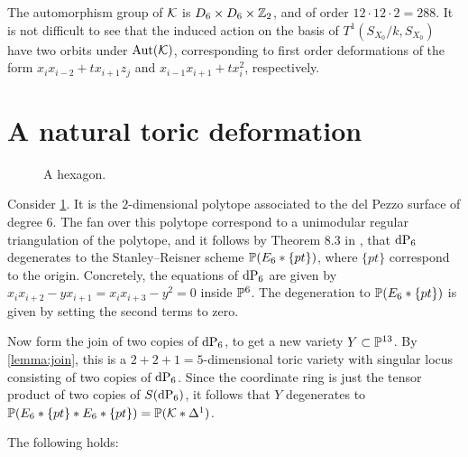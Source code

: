 The automorphism group of $\K$ is $D_6 \times D_6 \times \Z_2$, and of order $12 \cdot 12 \cdot 2=288$. It is not difficult to see that the induced action on the basis of $T^1(S_{X_0}/k,S_{X_0})$ have two orbits under $\Aut(\K)$, corresponding to first order deformations of the form $x_ix_{i-2}+t x_{i+1}z_j$ and $x_{i-1}x_{i+1}+tx_i^2$, respectively. 

\section{A natural toric deformation}

\begin{figure}[b]
\centering

\caption{A hexagon.}
\label{fig:hexagon}
\end{figure}

Consider \cref{fig:hexagon}. It is the $2$-dimensional polytope associated to the del Pezzo surface of degree $6$. The fan over this polytope correspond to a unimodular regular triangulation of the polytope, and it follows by Theorem 8.3 in \cite{sturmfels}, that $\dP6$ degenerates to the Stanley--Reisner scheme $\P(E_6 \ast \{pt\})$, where $\{ pt \}$ correspond to the origin. Concretely, the equations of $\dP6$ are given by $x_ix_{i+2}-yx_{i+1}=x_ix_{i+3}-y^2=0$ inside $\P^6$. The degeneration to $\P(E_6 \ast \{ pt \})$ is given by setting the second terms to zero.

Now form the join of two copies of $\dP6$, to get a new variety $Y \subset \P^{13}$. By \cref{lemma:join}, this is a $2+2+1=5$-dimensional toric variety with singular locus consisting of two copies of $\dP6$. Since the coordinate ring is just the tensor product of two copies of $S(\dP6)$, it follows that $Y$ degenerates to $\P(E_6 \ast \{pt\} \ast E_6 \ast \{ pt \})=\P(\K \ast \Delta^1)$.

The following holds:

